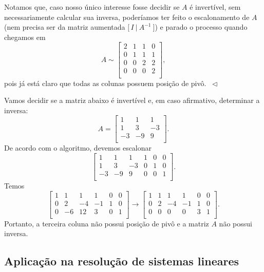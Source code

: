 \documentclass[../livro.tex]{subfiles}  %
\begin{document}
\begin{example}
	Notamos que, caso nosso único interesse fosse decidir se $A$ é invertível, sem necessariamente calcular sua inversa, poderíamos ter feito o escalonamento de $A$ (nem precisa ser da matriz aumentada $\big[ \, I \ | \ A^{-1} \ \big]$) e parado o processo quando chegamos em
	\[
	A \sim \left[
	\begin{array}{cccc}
	2 & 1 & 1 & 0 \\
	0 & 1 & 1 & 1 \\
	0 & 0 & 2 & 2 \\
	0 & 0 & 0 & 2 \\
	\end{array}
	\right],
	\] pois já está claro que todas as colunas possuem posição de pivô. $\ \lhd$
\end{example}



\begin{example}
	Vamos decidir se a matriz abaixo é invertível e, em caso afirmativo, determinar a inversa:
	\[
	A =
	\left[
	\begin{array}{cccc}
	1 & 1 & 1  \\
	1 & 3 & -3  \\
	-3 & -9 & 9  \\
	\end{array}
	\right].
	\] De acordo com o algoritmo, devemos escalonar
	\[
	\left[
	\begin{array}{ccc|ccc}
	1 & 1 & 1 & 1 & 0 & 0  \\
	1 & 3 & -3 & 0 & 1 & 0  \\
	-3 & -9 & 9  & 0 & 0 & 1 \\
	\end{array}
	\right].
	\] Temos
	\[
	\left[
	\begin{array}{ccc|ccc}
	1 & 1 & 1 & 1 & 0 & 0  \\
	0 & 2 & -4 & -1 & 1 & 0  \\
	0 & -6 & 12  & 3 & 0 & 1 \\
	\end{array}
	\right] \to
	\left[
	\begin{array}{ccc|ccc}
	1 & 1 & 1 & 1 & 0 & 0  \\
	0 & 2 & -4 & -1 & 1 & 0  \\
	0 & 0 & 0  & 0 & 3 & 1 \\
	\end{array}
	\right].
	\] Portanto, a terceira coluna não possui posição de pivô e a matriz $A$ não possui inversa.
\end{example}


\subsection{Aplicação na resolução de sistemas lineares}
\end{document}
